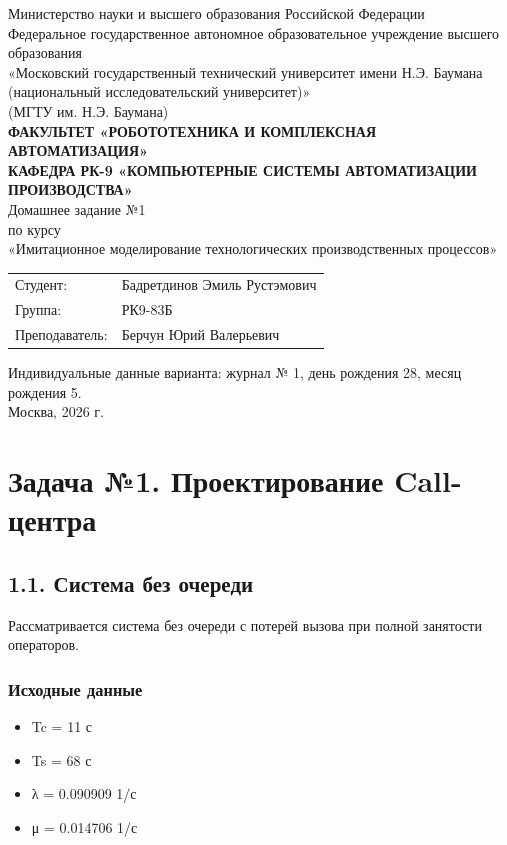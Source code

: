 \documentclass[12pt,a4paper]{article}
\begin{document}
\begin{titlepage}
\begin{center}
{\small Министерство науки и высшего образования Российской Федерации\\Федеральное государственное автономное образовательное учреждение высшего образования\\«Московский государственный технический университет имени Н.Э. Баумана\\(национальный исследовательский университет)»\\(МГТУ им. Н.Э. Баумана)}\\[0.8cm]
{\bfseries ФАКУЛЬТЕТ «РОБОТОТЕХНИКА И КОМПЛЕКСНАЯ АВТОМАТИЗАЦИЯ»}\\[0.25cm]
{\bfseries КАФЕДРА РК-9 «КОМПЬЮТЕРНЫЕ СИСТЕМЫ АВТОМАТИЗАЦИИ ПРОИЗВОДСТВА»}\\[1.6cm]
{\large Домашнее задание №1}\\[0.2cm]
{\normalsize по курсу}\\[0.2cm]
{\large «Имитационное моделирование технологических производственных процессов»}\\[1.8cm]
\begin{flushright}
\begin{tabular}{@{}p{3.6cm}p{8.4cm}@{}}
Студент: & Бадретдинов Эмиль Рустэмович\\
Группа: & РК9-83Б\\
Преподаватель: & Берчун Юрий Валерьевич
\end{tabular}
\end{flushright}
\vfill
{\normalsize Индивидуальные данные варианта: журнал № 1, день рождения 28, месяц рождения 5.}\\[1.2cm]
Москва, 2026 г.
\end{center}
\end{titlepage}

\section*{Задача №1. Проектирование Call-центра}
\subsection*{1.1. Система без очереди}
Рассматривается система без очереди с потерей вызова при полной занятости операторов.

\subsubsection*{Исходные данные}
\begin{itemize}
    \item Tc = 11 с
    \item Ts = 68 с
    \item λ = 0.090909 1/с
    \item μ = 0.014706 1/с
\end{itemize}
\end{document}
